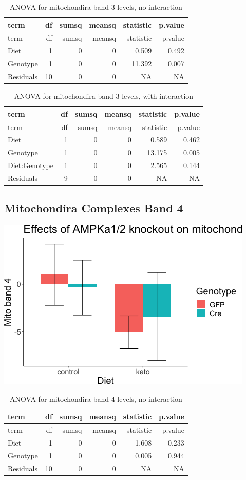 \documentclass[]{article}
\begin{document}
\begin{longtable}[]{@{}lrrrrr@{}}
\caption{ANOVA for mitochondira band 3 levels, no
interaction}\tabularnewline
\toprule
term & df & sumsq & meansq & statistic & p.value\tabularnewline
\midrule
\endfirsthead
\toprule
term & df & sumsq & meansq & statistic & p.value\tabularnewline
\midrule
\endhead
Diet & 1 & 0 & 0 & 0.509 & 0.492\tabularnewline
Genotype & 1 & 0 & 0 & 11.392 & 0.007\tabularnewline
Residuals & 10 & 0 & 0 & NA & NA\tabularnewline
\bottomrule
\end{longtable}

\begin{longtable}[]{@{}lrrrrr@{}}
\caption{ANOVA for mitochondira band 3 levels, with
interaction}\tabularnewline
\toprule
term & df & sumsq & meansq & statistic & p.value\tabularnewline
\midrule
\endfirsthead
\toprule
term & df & sumsq & meansq & statistic & p.value\tabularnewline
\midrule
\endhead
Diet & 1 & 0 & 0 & 0.589 & 0.462\tabularnewline
Genotype & 1 & 0 & 0 & 13.175 & 0.005\tabularnewline
Diet:Genotype & 1 & 0 & 0 & 2.565 & 0.144\tabularnewline
Residuals & 9 & 0 & 0 & NA & NA\tabularnewline
\bottomrule
\end{longtable}

\hypertarget{mitochondira-complexes-band-4}{%
\subsection{Mitochondira Complexes Band
4}\label{mitochondira-complexes-band-4}}

\includegraphics{figures/mitoband4-barplot-1.png}

\begin{longtable}[]{@{}lrrrrr@{}}
\caption{ANOVA for mitochondira band 4 levels, no
interaction}\tabularnewline
\toprule
term & df & sumsq & meansq & statistic & p.value\tabularnewline
\midrule
\endfirsthead
\toprule
term & df & sumsq & meansq & statistic & p.value\tabularnewline
\midrule
\endhead
Diet & 1 & 0 & 0 & 1.608 & 0.233\tabularnewline
Genotype & 1 & 0 & 0 & 0.005 & 0.944\tabularnewline
Residuals & 10 & 0 & 0 & NA & NA\tabularnewline
\bottomrule
\end{longtable}
\end{document}
